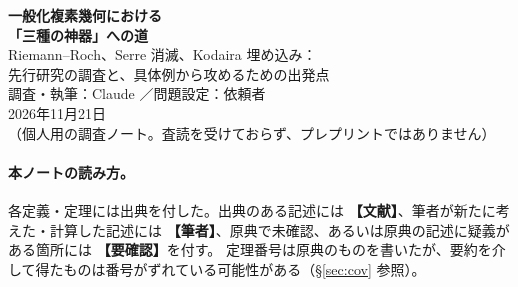 \documentclass[11pt,a4paper]{article}
\theoremstyle{definition}
\newcommand{\own}{\textcolor{red!65!black}{\textbf{【筆者】}}}
\newcommand{\litm}{\textcolor{blue!55!black}{\textbf{【文献】}}}
\newcommand{\chk}{\textcolor{orange!80!black}{\textbf{【要確認】}}}
\begin{document}
\begin{center}
{\LARGE\bfseries\sffamily 一般化複素幾何における\\[2pt]「三種の神器」への道}\\[6pt]
{\large Riemann--Roch、Serre 消滅、Kodaira 埋め込み：\\先行研究の調査と、具体例から攻めるための出発点}\\[10pt]
{\large 調査・執筆：Claude \quad／\quad 問題設定：依頼者}\\[2pt]
2026年11月21日\\[2pt]
{\small （個人用の調査ノート。査読を受けておらず、プレプリントではありません）}
\end{center}

\begin{abstract}
\noindent
複素幾何の「三種の神器」、すなわち Hirzebruch--Riemann--Roch の定理、Serre の消滅定理、Kodaira の埋め込み定理の一般化複素幾何版を考えるために、先行研究を調べてまとめた。
(i) 一般化複素構造と一般化 Kähler 幾何の定義と基本定理（Gualtieri, Cavalcanti）、
(ii) Lie 亜群版の Kähler 理論と Kodaira--Nakano 消滅（Hu, 2024）、
(iii) 正則型の一般化複素多様体上の「強」一般化正則直線束に対する Kodaira 型・Serre 型消滅（Pal--Poddar, 2024）
の三つを、定義・主張・仮定・仮定が証明のどこで効くか、という観点で整理する。
さらに筆者自身の観察として、(a) 一般化複素多様体上では「一般化正則関数」がシンプレクティック方向に局所定数となるため、断面による埋め込みという形の Kodaira 定理は成り立たず、葉空間への写像として定式化し直す必要があること、
(b) $\bar\partial$ 型の楕円型複体 $(\wedge L^*\otimes E,\partial_E)$ の全 Euler 標数は $E$ の階数と多様体の Euler 数だけで決まり、したがって Riemann--Roch の一般化には何らかの「細分」が必須であること（複素の場合の乗積例で確認）、を述べる。
一般化 Kodaira 埋め込み定理および一般の一般化 Riemann--Roch 公式は、調査した範囲では見つからなかった。
\end{abstract}

\paragraph{本ノートの読み方。}
各定義・定理には出典を付した。出典のある記述には \litm、筆者が新たに考えた・計算した記述には \own、原典で未確認、あるいは原典の記述に疑義がある箇所には \chk を付す。
定理番号は原典のものを書いたが、要約を介して得たものは番号がずれている可能性がある（\S\ref{sec:cov} 参照）。

\tableofcontents

\end{document}
